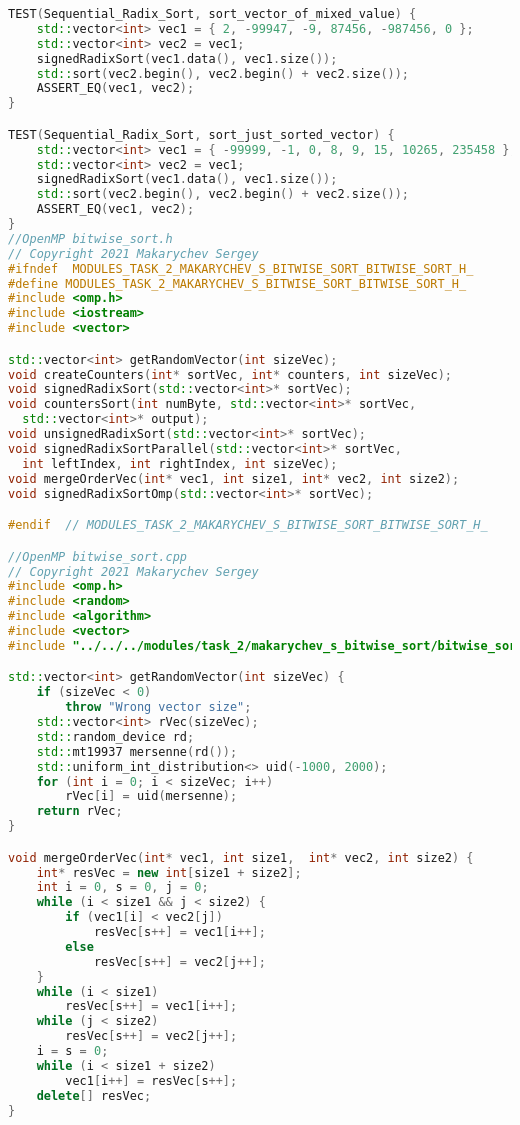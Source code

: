 \documentclass{report}
\begin{document}
\begin{lstlisting}[language=C++]
TEST(Sequential_Radix_Sort, sort_vector_of_mixed_value) {
    std::vector<int> vec1 = { 2, -99947, -9, 87456, -987456, 0 };
    std::vector<int> vec2 = vec1;
    signedRadixSort(vec1.data(), vec1.size());
    std::sort(vec2.begin(), vec2.begin() + vec2.size());
    ASSERT_EQ(vec1, vec2);
}

TEST(Sequential_Radix_Sort, sort_just_sorted_vector) {
    std::vector<int> vec1 = { -99999, -1, 0, 8, 9, 15, 10265, 235458 };
    std::vector<int> vec2 = vec1;
    signedRadixSort(vec1.data(), vec1.size());
    std::sort(vec2.begin(), vec2.begin() + vec2.size());
    ASSERT_EQ(vec1, vec2);
}
//OpenMP bitwise_sort.h
// Copyright 2021 Makarychev Sergey
#ifndef  MODULES_TASK_2_MAKARYCHEV_S_BITWISE_SORT_BITWISE_SORT_H_
#define MODULES_TASK_2_MAKARYCHEV_S_BITWISE_SORT_BITWISE_SORT_H_
#include <omp.h>
#include <iostream>
#include <vector>

std::vector<int> getRandomVector(int sizeVec);
void createCounters(int* sortVec, int* counters, int sizeVec);
void signedRadixSort(std::vector<int>* sortVec);
void countersSort(int numByte, std::vector<int>* sortVec,
  std::vector<int>* output);
void unsignedRadixSort(std::vector<int>* sortVec);
void signedRadixSortParallel(std::vector<int>* sortVec,
  int leftIndex, int rightIndex, int sizeVec);
void mergeOrderVec(int* vec1, int size1, int* vec2, int size2);
void signedRadixSortOmp(std::vector<int>* sortVec);

#endif  // MODULES_TASK_2_MAKARYCHEV_S_BITWISE_SORT_BITWISE_SORT_H_

//OpenMP bitwise_sort.cpp
// Copyright 2021 Makarychev Sergey
#include <omp.h>
#include <random>
#include <algorithm>
#include <vector>
#include "../../../modules/task_2/makarychev_s_bitwise_sort/bitwise_sort.h"

std::vector<int> getRandomVector(int sizeVec) {
    if (sizeVec < 0)
        throw "Wrong vector size";
    std::vector<int> rVec(sizeVec);
    std::random_device rd;
    std::mt19937 mersenne(rd());
    std::uniform_int_distribution<> uid(-1000, 2000);
    for (int i = 0; i < sizeVec; i++)
        rVec[i] = uid(mersenne);
    return rVec;
}

void mergeOrderVec(int* vec1, int size1,  int* vec2, int size2) {
    int* resVec = new int[size1 + size2];
    int i = 0, s = 0, j = 0;
    while (i < size1 && j < size2) {
        if (vec1[i] < vec2[j])
            resVec[s++] = vec1[i++];
        else
            resVec[s++] = vec2[j++];
    }
    while (i < size1)
        resVec[s++] = vec1[i++];
    while (j < size2)
        resVec[s++] = vec2[j++];
    i = s = 0;
    while (i < size1 + size2)
        vec1[i++] = resVec[s++];
    delete[] resVec;
}


\end{lstlisting}
\end{document}
